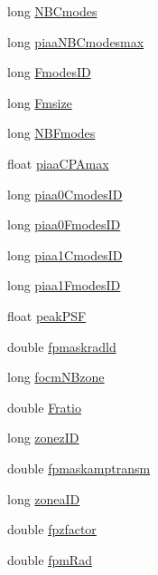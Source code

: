 \begin{DoxyCompactItemize}
long \hyperlink{structOPTPIAACMCDESIGN_a8206d0c4c019d9c2a6dda4d22cf7d8a6}{N\+B\+Cmodes}
\item 
long \hyperlink{structOPTPIAACMCDESIGN_a8fbed9f02c0a17dcc2f233be4c4af697}{piaa\+N\+B\+Cmodesmax}
\item 
long \hyperlink{structOPTPIAACMCDESIGN_a6b13c1628f90db964d8279de9aee4f23}{Fmodes\+I\+D}
\item 
long \hyperlink{structOPTPIAACMCDESIGN_a0e84939f7dbafe942bc7725bd6ddfa8e}{Fmsize}
\item 
long \hyperlink{structOPTPIAACMCDESIGN_ac46c632c680659b8c588701a497dbb4b}{N\+B\+Fmodes}
\item 
float \hyperlink{structOPTPIAACMCDESIGN_a3fa5fbe424c220ac11e527ae5081e2c7}{piaa\+C\+P\+Amax}
\item 
long \hyperlink{structOPTPIAACMCDESIGN_a9b381fe9d31e74c5306577c8ca59116b}{piaa0\+Cmodes\+I\+D}
\item 
long \hyperlink{structOPTPIAACMCDESIGN_a9101237f5e1b7af8a40014685cb399b9}{piaa0\+Fmodes\+I\+D}
\item 
long \hyperlink{structOPTPIAACMCDESIGN_aa59c49ac1d770c1ee0e3bce22e4d5863}{piaa1\+Cmodes\+I\+D}
\item 
long \hyperlink{structOPTPIAACMCDESIGN_a5fa43c209dc396f65f2d74d3bb275e75}{piaa1\+Fmodes\+I\+D}
\item 
float \hyperlink{structOPTPIAACMCDESIGN_a7a4db3779c6d9030069e9311837a361a}{peak\+P\+S\+F}
\item 
double \hyperlink{structOPTPIAACMCDESIGN_ad6c571d51ab93c62406a1485713652c1}{fpmaskradld}
\item 
long \hyperlink{structOPTPIAACMCDESIGN_af885127a147736127de2d00f0872f7d3}{focm\+N\+Bzone}
\item 
double \hyperlink{structOPTPIAACMCDESIGN_a8395925e8cc76395b3f4efa8132c290c}{Fratio}
\item 
long \hyperlink{structOPTPIAACMCDESIGN_a46c2ef78ec06d39b947a793d0a03dc28}{zonez\+I\+D}
\item 
double \hyperlink{structOPTPIAACMCDESIGN_a263a0425fe40eda25832b7490b8b0391}{fpmaskamptransm}
\item 
long \hyperlink{structOPTPIAACMCDESIGN_afdfb76344ee9a82f3a5790fcb602ade6}{zonea\+I\+D}
\item 
double \hyperlink{structOPTPIAACMCDESIGN_a96c58c0598cb36779f027aaadb62073d}{fpzfactor}
\item 
double \hyperlink{structOPTPIAACMCDESIGN_aa1794c4a0929583574e315a064a1c538}{fpm\+Rad}
\item 

\end{DoxyCompactItemize}
